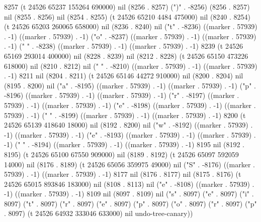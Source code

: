 8257 (t 24526 65237 155264 690000) nil (8256 . 8257) (")" . -8256) (8256 . 8257) nil (8255 . 8256) nil (8254 . 8255) (t 24526 65210 4484 475000) nil (8240 . 8254) (t 24526 65203 260065 658000) nil (8236 . 8240) nil ("t" . -8236) ((marker . 57939) . -1) ((marker . 57939) . -1) ("o" . -8237) ((marker . 57939) . -1) ((marker . 57939) . -1) (" " . -8238) ((marker . 57939) . -1) ((marker . 57939) . -1) 8239 (t 24526 65169 293014 400000) nil (8228 . 8239) nil (8212 . 8228) (t 24526 65150 473226 618000) nil (8210 . 8212) nil (" " . -8210) ((marker . 57939) . -1) ((marker . 57939) . -1) 8211 nil (8204 . 8211) (t 24526 65146 44272 910000) nil (8200 . 8204) nil (8195 . 8200) nil ("a" . -8195) ((marker . 57939) . -1) ((marker . 57939) . -1) ("p" . -8196) ((marker . 57939) . -1) ((marker . 57939) . -1) ("r" . -8197) ((marker . 57939) . -1) ((marker . 57939) . -1) ("e" . -8198) ((marker . 57939) . -1) ((marker . 57939) . -1) (" " . -8199) ((marker . 57939) . -1) ((marker . 57939) . -1) 8200 (t 24526 65139 418640 18000) nil (8192 . 8200) nil ("w" . -8192) ((marker . 57939) . -1) ((marker . 57939) . -1) ("e" . -8193) ((marker . 57939) . -1) ((marker . 57939) . -1) (" " . -8194) ((marker . 57939) . -1) ((marker . 57939) . -1) 8195 nil (8192 . 8195) (t 24526 65100 67550 909000) nil (8189 . 8192) (t 24526 65097 592059 14000) nil (8176 . 8189) (t 24526 65056 359975 49000) nil ("S" . -8176) ((marker . 57939) . -1) ((marker . 57939) . -1) 8177 nil (8176 . 8177) nil (8175 . 8176) (t 24526 65015 893846 183000) nil (8108 . 8113) nil ("e" . -8108) ((marker . 57939) . -1) ((marker . 57939) . -1) 8109 nil (8097 . 8109) nil ("s" . 8097) ("e" . 8097) ("i" . 8097) ("t" . 8097) ("r" . 8097) ("e" . 8097) ("p" . 8097) ("o" . 8097) ("r" . 8097) ("p" . 8097) (t 24526 64932 333046 633000) nil undo-tree-canary))
